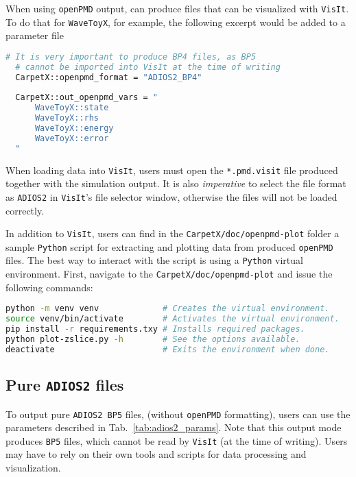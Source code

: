 When using \texttt{openPMD} output, \CarpetX\space can produce files that can be visualized with \texttt{VisIt}. To do that for \texttt{WaveToyX}, for example, the following excerpt would be added to a parameter file

\begin{lstlisting}[language=bash]
  # It is very important to produce BP4 files, as BP5
  # cannot be imported into VisIt at the time of writing
  CarpetX::openpmd_format = "ADIOS2_BP4"
  
  CarpetX::out_openpmd_vars = "
      WaveToyX::state
      WaveToyX::rhs
      WaveToyX::energy
      WaveToyX::error
  "
\end{lstlisting}

When loading data into \texttt{VisIt}, users must open the \texttt{*.pmd.visit} file produced together with the simulation output. It is also \textit{imperative} to select the file format as \texttt{ADIOS2} in \texttt{VisIt}'s file selector window, otherwise the files will not be loaded correctly.

In addition to \texttt{VisIt}, users can find in the \texttt{CarpetX/doc/openpmd-plot} folder a sample \texttt{Python} script for extracting and plotting data from \CarpetX\space produced \texttt{openPMD} files. The best way to interact with the script is using a \texttt{Python} virtual environment. First, navigate to the \texttt{CarpetX/doc/openpmd-plot} and issue the following commands:

\begin{lstlisting}[language=bash]
python -m venv venv             # Creates the virtual environment.
source venv/bin/activate        # Activates the virtual environment.
pip install -r requirements.txy # Installs required packages.
python plot-zslice.py -h        # See the options available.
deactivate                      # Exits the environment when done.
\end{lstlisting}

\subsection{Pure \texttt{ADIOS2} files}

To output pure \texttt{ADIOS2 BP5} files, (without \texttt{openPMD} formatting), users can use the parameters described in Tab.~\ref{tab:adios2_params}. Note that this output mode produces \texttt{BP5} files, which cannot be read by \texttt{VisIt} (at the time of writing). Users may have to rely on their own tools and scripts for data processing and visualization.

